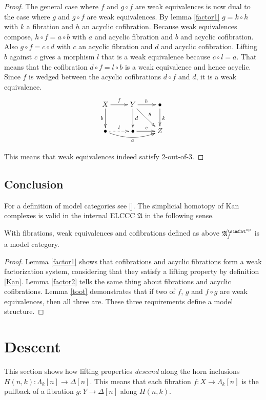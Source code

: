 \documentclass{tac}
\newcommand\hide[1]{}
\newcommand\dual{^{\mathrm{op}}}
\newcommand\s{^{\simCat\dual}}
\newcommand\of{:}
\newcommand\simplex\Delta
\newcommand\horn\Lambda
\newcommand\f{_f}
\newcommand\ambient{\mathfrak A}
\begin{document}
\begin{proof}
The general case where $f$ and $g\circ f$ are weak equivalences is now dual to the case where $g$ and $g\circ f$ are weak equivalences. By lemma \ref{factor1} $g=k\circ h$ with $k$ a fibration and $h$ an acyclic cofibration. Because weak equivalences compose, $h\circ f = a\circ b$ with $a$ and acyclic fibration and $b$ and acyclic cofibration. 
Also $g\circ f = c\circ d$ with $c$ an acyclic fibration and $d$ and acyclic cofibration. 
Lifting $b$ against $c$ gives a morphism $l$ that is a weak equivalence because $c\circ l = a$. That means that the cofibration $d\circ f = l\circ b$ is a weak equivalence and hence acyclic. Since $f$ is wedged between the acyclic cofibrations $d\circ f$ and $d$, it is a weak equivalence. 
\[\xymatrix{
X\ar[r]^f\ar[d]_b & Y\ar[r]^h\ar[d]^d\ar[dr]^g & \bullet\ar[d]^k\\
\bullet\ar@/_2ex/[rr]_a\ar@{.>}[r]^l & \bullet\ar[r]^c & Z
}\]

This means that weak equivalences indeed satisfy 2-out-of-3.
\end{proof}


\subsection{Conclusion}
For a definition of model categories see [\cite{Hovey99, GJSHT}]. The simplicial homotopy of Kan complexes is valid in the internal ELCCC $\ambient$ in the following sense.

\begin{theorem}
With fibrations, weak equivalences and cofibrations defined as above $\ambient\s\f$ is a model category.
\label{model category}
\end{theorem}

\begin{proof}
Lemma \ref{factor1} shows that cofibrations and acyclic fibrations form a weak factorization system, considering that they satisfy a lifting property by definition \ref{Kan}. Lemma \ref{factor2} tells the same thing about fibrations and acyclic cofibrations. Lemma \ref{toot} demonstrates that if two of $f$, $g$ and $f\circ g$ are weak equivalences, then all three are. These three requirements define a model structure.
\end{proof}

\section{Descent} \hide{Does this belong here, or in a seperate paper?}
This section shows how lifting properties \emph{descend} along the horn inclusions $H(n,k)\of \horn_k[n]\to\simplex[n]$. This means that each fibration $f\of X\to\horn_k[n]$ is the pullback of a fibration $g\of Y\to\simplex[n]$ along $H(n,k)$.
\end{document}
